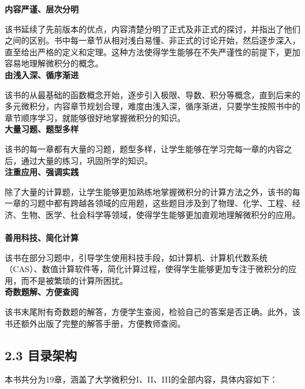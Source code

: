 \documentclass{report}
\begin{document}
\noindent\textbf{内容严谨、层次分明}

\noindent 该书延续了先前版本的优点，内容清楚分明了正式及非正式的探讨，并指出了他们之间的区别。书中每一章节从相对浅白易懂、非正式的讨论开始，然后逐步深入，直至给出严格的定义和定理。这种方法使得学生能够在不失严谨性的前提下，更加容易地理解微积分的概念。
~\\

\noindent\textbf{由浅入深、循序渐进}

\noindent 该书的从最基础的函数概念开始，逐步引入极限、导数、积分等概念，直到后来的多元微积分，内容章节规划合理，难度由浅入深，循序渐进，只要学生按照书中的章节顺序学习，就能够很好地掌握微积分的知识。
~\\

\noindent\textbf{大量习题、题型多样}

\noindent 该书的每一章都有大量的习题，题型多样，让学生能够在学习完每一章的内容之后，通过大量的练习，巩固所学的知识。
~\\

\noindent\textbf{注重应用、强调实践}

\noindent 除了大量的计算题，让学生能够更加熟练地掌握微积分的计算方法之外，该书的每一章的习题中都有跨越各领域的应用题，这些题目涉及到了物理、化学、工程、经济、生物、医学、社会科学等领域，使得学生能够更加直观地理解微积分的应用。
~\\

\noindent\textbf{善用科技、简化计算}

\noindent 该书在部分习题中，引导学生使用科技手段，如计算机、计算机代数系统（CAS）、数值计算软件等，简化计算过程，使得学生能够更加专注于微积分的应用，而不是被繁琐的计算所困扰。
~\\

\noindent\textbf{奇数题解、方便查阅}

\noindent 该书末尾附有奇数题的解答，方便学生查阅，检验自己的答案是否正确。此外，该书还额外出版了完整的解答手册，方便教师查阅。

\newpage
\subsection*{2.3 目录架构}

本书共分为19章，涵盖了大学微积分I、II、III的全部内容，具体内容如下：
\end{document}
